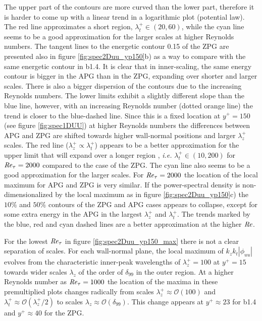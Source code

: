 The upper part of the contours are more curved than the lower part, therefore it is harder to come up with a linear trend in a logarithmic plot (potential law). The red line approximates a short region, $\lambda_t^+ \in (20, 60)$, while the cyan line seems to be a good approximation for the larger scales at higher Reynolds numbers.
The tangent lines to the energetic contour 0.15 of the ZPG are presented also in figure \ref{fig:spec2Duu_yp150}b) as a way to compare with the same energetic contour in b1.4. It is clear that in inner-scaling, the same energy contour is bigger in the APG than in the ZPG, expanding over shorter and larger scales. There is also a bigger dispersion of the contours due to the increasing Reynolds numbers.
The lower limits exhibit a slightly different slope than the blue line, however, with an increasing Reynolds number (dotted orange line) the trend is closer to the blue-dashed line. Since this is a fixed location at $y^+=150$ (see figure \ref{fig:spec1DUU}) at higher Reynolds numbers the differences between APG and ZPG are shifted towards higher wall-normal positions and larger $\lambda_z^+$ scales.
The red line ($\lambda_z^+ \propto \lambda_t^+$) appears to be a better approximation for the upper limit that will expand over a longer region , {\it i.e.} $\lambda_t^+ \in (10, 200)$ for $\mbox{\textit{Re}}_{\tau}=2000$ compared to the case of the ZPG. The cyan line also seems to be a good approximation for the larger scales.
For $\mbox{\textit{Re}}_{\tau}=2000$ the location of the local maximum for APG and ZPG is very similar. If the power-spectral density is non-dimensionalized by the local maximum as in figure \ref{fig:spec2Duu_yp150}c) the $10\%$ and $50\%$ contours of the ZPG and APG cases appears to collapse, except for some extra energy in the APG in the largest $\lambda_z^+$ and $\lambda_t^+$. The trends marked by the blue, red and cyan dashed lines are a better approximation at the higher $\mbox{\textit{Re}}$.

For the lowest $\mbox{\textit{Re}}_{\tau}$ in figure \ref{fig:spec2Duu_yp150_max} there is not a clear separation of scales. For each wall-normal plane, the local maximum of $k_z k_t |\phi_{uu}|$ evolves from the characteristic inner-peak wavelengths of $\lambda_z^+=100$ at $y^+=15$ towards wider scales $\lambda_z$ of the order of $\delta_{99}$ in the outer region.
At a higher Reynolds number as $\mbox{\textit{Re}}_{\tau}=1000$ the location of the maxima in these premultiplied plots changes radically from scales $\lambda_z^+ \approx \mathcal{O} (100)$ and $\lambda_t^+ \approx \mathcal{O} (\lambda_z^+/2)$ to scales $\lambda_z \approx \mathcal{O}(\delta_{99})$. This change appears at $y^+\approx 23$ for b1.4 and $y^+\approx 40$ for the ZPG.  

